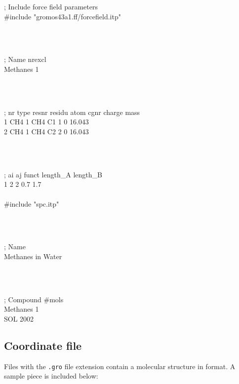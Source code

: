 \begin{tt}
; Include force field parameters\\
\#include "gromos43a1.ff/forcefield.itp"\\
\end{tt}\\
\begin{tt}
[ moleculetype ]\\
; Name            nrexcl\\
Methanes               1\\
\end{tt}\\
\begin{tt}
[ atoms ]\\
; nr   type   resnr  residu   atom    cgnr     charge    mass\\
   1    CH4     1     CH4      C1       1          0    16.043\\
   2    CH4     1     CH4      C2       2          0    16.043\\
\end{tt}\\
\begin{tt}
[ constraints ]\\
;  ai    aj funct   length\_A  length\_B\\
    1     2     2        0.7       1.7\\
\\
\#include "spc.itp"\\
\end{tt}\\
\begin{tt}
[ system ]\\
; Name\\
Methanes in Water\\
\end{tt}\\
\begin{tt}
[ molecules ]\\
; Compound        \#mols\\
Methanes              1\\
SOL                2002\\
\end{tt}

\subsection{Coordinate file}
\label{subsec:grofile}
Files with the {\tt .gro} file extension contain a molecular structure in 
 format. A sample piece is included below:


